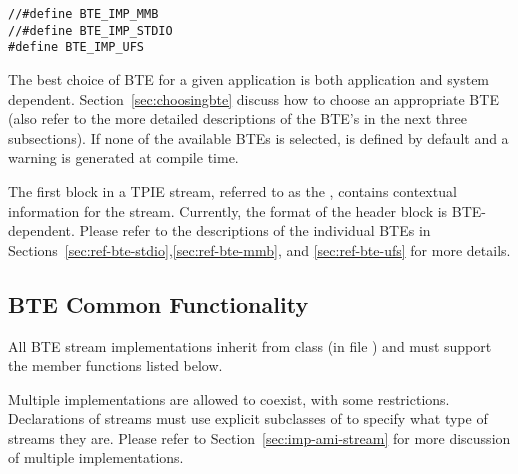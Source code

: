 \begin{verbatim}
//#define BTE_IMP_MMB
//#define BTE_IMP_STDIO
#define BTE_IMP_UFS
\end{verbatim}

 The best choice of BTE for a
given application is both application and system dependent.
Section~\ref{sec:choosingbte} discuss how to choose an
appropriate BTE (also refer to the more detailed
descriptions of the BTE's in the next three subsections). If
none of the available BTEs is selected,
 is defined by default and a warning
is generated at compile time.


The first block in a TPIE stream, referred to as the
, contains
contextual information for the stream. Currently, the format
of the header block is BTE-dependent. Please refer to the
descriptions of the individual BTEs in
Sections~\ref{sec:ref-bte-stdio},\ref{sec:ref-bte-mmb}, and
\ref{sec:ref-bte-ufs} for more details.

\subsection{BTE Common Functionality}

All BTE stream implementations inherit from class
 (in file
) and must support the member
functions listed below. 

Multiple implementations are allowed to coexist, with some
restrictions.  Declarations of streams must use explicit subclasses
of  to specify what type of streams they
are. Please refer to Section~\ref{sec:imp-ami-stream} for
more discussion of multiple implementations.


